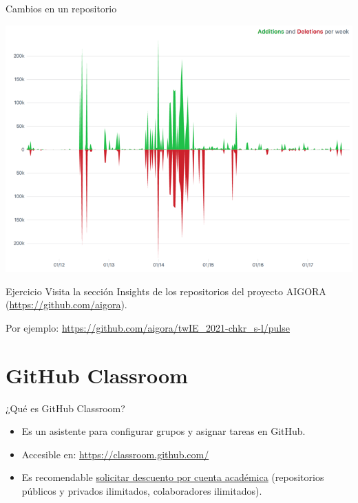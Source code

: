 \documentclass[aspectratio=169, xcolor={usenames,svgnames,dvipsnames}]{beamer}
\begin{document}
\begin{frame}[label={sec:org956ad0d}]{Cambios en un repositorio}
\begin{center}
\includegraphics[width=.9\linewidth]{figs/repo_code_frequency_graph_dotcom.png}
\end{center}
\end{frame}

\begin{frame}[label={sec:org1f76ecf}]{}
\begin{block}{Ejercicio}
Visita la sección Insights de los repositorios del proyecto AIGORA (\url{https://github.com/aigora}). 

Por ejemplo: \url{https://github.com/aigora/twIE\_2021-chkr\_s-l/pulse}
\end{block}
\end{frame}

\section{GitHub Classroom}
\label{sec:orgfdd23a8}

\begin{frame}[label={sec:org3aa5e06}]{¿Qué es GitHub Classroom?}
\begin{itemize}
\item Es un asistente para configurar grupos y asignar tareas en GitHub.

\item Accesible en: \url{https://classroom.github.com/}

\item Es recomendable \href{https://help.github.com/en/articles/applying-for-an-educator-or-researcher-discount}{solicitar descuento por cuenta académica} (repositorios públicos y privados ilimitados, colaboradores ilimitados).
\end{itemize}
\end{frame}
\end{document}
